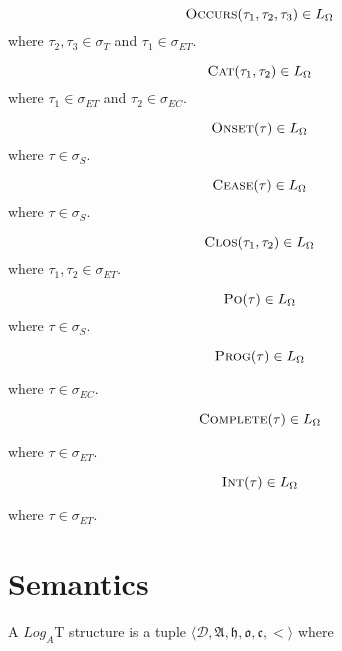 


\[
	\textsc{Occurs}(\tau_1, \tau_2, \tau_3) \in L_{\Omega}
\]
where $\tau_2, \tau_3 \in \sigma_T$  and $\tau_1 \in \sigma_{ET}$.

\[
	\textsc{Cat}(\tau_1, \tau_2) \in L_{\Omega}
\]
where $\tau_1 \in \sigma_{ET}$ and $\tau_2 \in \sigma_{EC}$.

\[
	\textsc{Onset}(\tau) \in L_{\Omega}
\]
where $\tau \in \sigma_S$.

\[
	\textsc{Cease}(\tau) \in L_{\Omega}
\]
where $\tau \in \sigma_S$.

\[
	\textsc{Clos}(\tau_1, \tau_2) \in L_{\Omega}
\]
where $\tau_1, \tau_2 \in \sigma_{ET}$.

\[
	\textsc{Po}(\tau) \in L_{\Omega}
\]
where $\tau \in \sigma_S$.

\[
	\textsc{Prog}(\tau) \in L_{\Omega}
\]

where $\tau \in \sigma_{EC}$.

\[
	\textsc{Complete}(\tau) \in L_{\Omega}
\]

where $\tau \in \sigma_{ET}$.

\[
	\textsc{Int}(\tau) \in L_{\Omega}
\]

where $\tau \in \sigma_{ET}$.

\section{Semantics}

\begin{defn}
	A $Log_A$T structure is a tuple $\langle \mathcal{D},\mathfrak{A}, \mathfrak{h}, \mathfrak{o}, \mathfrak{c}, <
		\rangle$ where
\end{defn}


